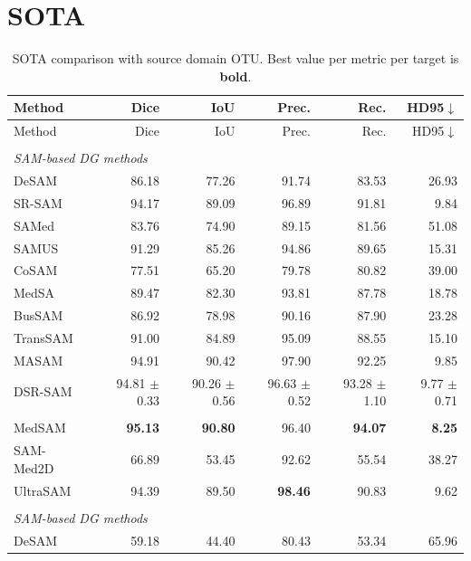\documentclass[10pt]{article}
\begin{document}
\section{SOTA}
\label{sec:sota}

{\small
\begin{longtable}{lrrrrr}
\caption{SOTA comparison with source domain OTU. Best value per metric per target is \textbf{bold}.}
\label{tab:sota_otu}\\
\toprule
Method & Dice & IoU & Prec. & Rec. & HD95$\downarrow$ \\
\midrule
\endfirsthead
\toprule
Method & Dice & IoU & Prec. & Rec. & HD95$\downarrow$ \\
\midrule
\endhead
\endfoot
\bottomrule
\endlastfoot
\multicolumn{6}{l}{\textit{Target: OVATUS}} \\
\midrule
\multicolumn{6}{l}{\textit{SAM-based DG methods}} \\
DeSAM & 86.18 & 77.26 & 91.74 & 83.53 & 26.93 \\
SR-SAM & 94.17 & 89.09 & 96.89 & 91.81 & 9.84 \\
SAMed & 83.76 & 74.90 & 89.15 & 81.56 & 51.08 \\
SAMUS & 91.29 & 85.26 & 94.86 & 89.65 & 15.31 \\
CoSAM & 77.51 & 65.20 & 79.78 & 80.82 & 39.00 \\
MedSA & 89.47 & 82.30 & 93.81 & 87.78 & 18.78 \\
BusSAM & 86.92 & 78.98 & 90.16 & 87.90 & 23.28 \\
TransSAM & 91.00 & 84.89 & 95.09 & 88.55 & 15.10 \\
MASAM & 94.91 & 90.42 & 97.90 & 92.25 & 9.85 \\
DSR-SAM & 94.81 $\pm$ 0.33 & 90.26 $\pm$ 0.56 & 96.63 $\pm$ 0.52 & 93.28 $\pm$ 1.10 & 9.77 $\pm$ 0.71 \\
\addlinespace[2pt]
\multicolumn{6}{l}{\textit{Zero-shot foundation models}} \\
MedSAM & \textbf{95.13} & \textbf{90.80} & 96.40 & \textbf{94.07} & \textbf{8.25} \\
SAM-Med2D & 66.89 & 53.45 & 92.62 & 55.54 & 38.27 \\
UltraSAM & 94.39 & 89.50 & \textbf{98.46} & 90.83 & 9.62 \\
\addlinespace[4pt]
\multicolumn{6}{l}{\textit{Target: USOVA}} \\
\midrule
\multicolumn{6}{l}{\textit{SAM-based DG methods}} \\
DeSAM & 59.18 & 44.40 & 80.43 & 53.34 & 65.96 \\

\end{longtable}}
\end{document}
